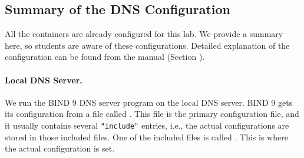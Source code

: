 

\subsection{Summary of the DNS Configuration} 

All the containers are already configured for this lab. 
We provide a summary here, so students are aware of 
these configurations. Detailed explanation
of the configuration can be found from the manual (Section \manualdns).



\paragraph{Local DNS Server.} 
We run the BIND 9 DNS server program on the local DNS server. 
BIND 9 gets its configuration from a file called . This file
is the primary configuration file, and it usually contains several \texttt{"include"}
entries, i.e., the actual configurations are stored in those included files. One of the
included files is called . 
This is where the actual configuration is set. 


